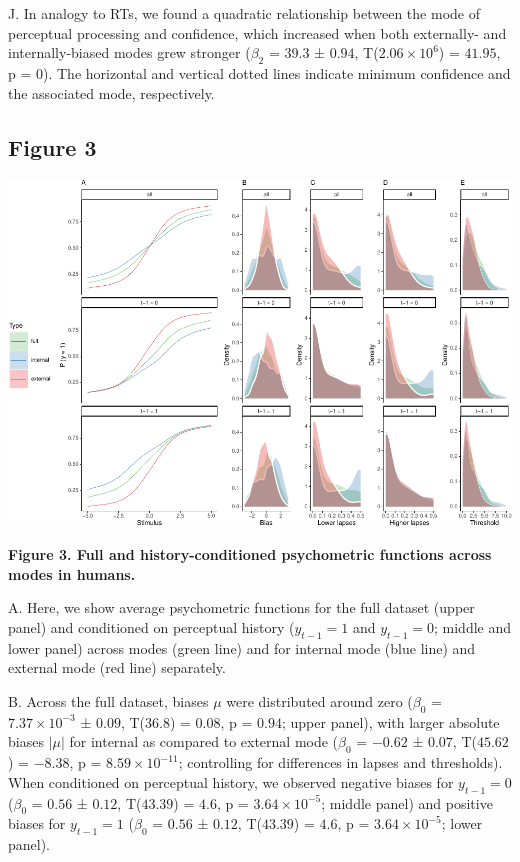 \documentclass[
]{article}
\begin{document}
J. In analogy to RTs, we found a quadratic relationship between the mode
of perceptual processing and confidence, which increased when both
externally- and internally-biased modes grew stronger (\(\beta_2\) =
\(39.3\) ± \(0.94\), T(\(\ensuremath{2.06\times 10^{6}}\)) = \(41.95\),
p = \(0\)). The horizontal and vertical dotted lines indicate minimum
confidence and the associated mode, respectively.

\newpage

\hypertarget{figure-3}{%
\subsection{Figure 3}\label{figure-3}}

\includegraphics{modes_mouse_files/figure-latex/Figure_3-1.pdf}

\textbf{Figure 3. Full and history-conditioned psychometric functions
across modes in humans.}

A. Here, we show average psychometric functions for the full dataset
(upper panel) and conditioned on perceptual history (\(y_{t-1} = 1\) and
\(y_{t-1} = 0\); middle and lower panel) across modes (green line) and
for internal mode (blue line) and external mode (red line) separately.

B. Across the full dataset, biases \(\mu\) were distributed around zero
(\(\beta_0\) = \(\ensuremath{7.37\times 10^{-3}}\) ± \(0.09\),
T(\(36.8\)) = \(0.08\), p = \(0.94\); upper panel), with larger absolute
biases \(|\mu|\) for internal as compared to external mode (\(\beta_0\)
= \(-0.62\) ± \(0.07\), T(\(45.62\)) = \(-8.38\), p =
\(\ensuremath{8.59\times 10^{-11}}\); controlling for differences in
lapses and thresholds). When conditioned on perceptual history, we
observed negative biases for \(y_{t-1} = 0\) (\(\beta_0\) = \(0.56\) ±
\(0.12\), T(\(43.39\)) = \(4.6\), p =
\(\ensuremath{3.64\times 10^{-5}}\); middle panel) and positive biases
for \(y_{t-1} = 1\) (\(\beta_0\) = \(0.56\) ± \(0.12\), T(\(43.39\)) =
\(4.6\), p = \(\ensuremath{3.64\times 10^{-5}}\); lower panel).
\end{document}
